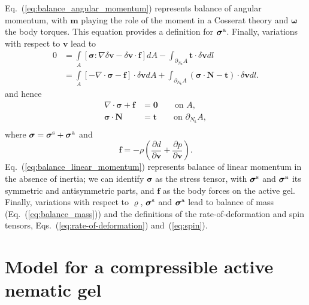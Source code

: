 Eq.~(\ref{eq:balance_angular_momentum}) represents balance of angular momentum, with $\bm{m}$ playing the role of the moment in a Cosserat theory \cite{cosserat1896theorie} and $\bm{\omega}$ the  body torques.	This equation provides a definition for $\bm{\sigma}^{\rm a}$. Finally, variations with respect to $\bm{v}$ lead to 
\begin{equation}
	\label{eq:weak_v}
	\begin{aligned}
		0 &= \underset{A}{\int} \left[\bm{\sigma}:\nabla\delta\bm{v} - \delta\bm{v}\cdot\bm{f} \right]dA - \int_{\partial_{N_{\bm{t}}} A}  \bm{t} \cdot \delta\bm{v} dl\\
		&=\underset{A}{\int} \left[-\nabla\cdot\bm{\sigma} - \bm{f} \right] \cdot \delta\bm{v}dA + \int_{\partial_{N_{\bm{t}}} A} \left(\bm{\sigma}\cdot \bm{N} -\bm{t} \right)\cdot \delta\bm{v} dl.
	\end{aligned}
\end{equation}
and hence 
\begin{equation}
	\label{eq:balance_linear_momentum}
	\begin{aligned}
		\nabla\cdot\bm{\sigma} + \bm{f} &= \bm{0} \qquad \text{on } A,\\
		\bm{\sigma}\cdot\bm{N} &= \bm{t} \qquad \text{on } \partial_{N_{\bm{t}}} A,\\
	\end{aligned}
\end{equation}
where $\bm{\sigma}=\bm{\sigma}^{\rm s} + \bm{\sigma}^{\rm a}$ and 
\begin{equation}
	\bm{f}=-\rho \left(\frac{\partial  d}{\partial \bm{v}} + \frac{\partial  p}{\partial \bm{v}}\right).
\end{equation}
Eq.~(\ref{eq:balance_linear_momentum}) represents balance of linear momentum in the 
absence of inertia; we can identify $\bm{\sigma}$ as the stress tensor, with $\bm{\sigma}^{\rm s}$ and $\bm{\sigma}^{\rm a}$  its symmetric and antisymmetric parts, and $\bm{f}$ as the body forces on the active gel.  Finally, variations with respect to $\varrho $, $\bm{\sigma}^{\rm s}$ and $\bm{\sigma}^{\rm a}$ lead to balance of mass (Eq.~(\ref{eq:balance_mass})) and the definitions of the rate-of-deformation and spin tensors, Eqs.~(\ref{eq:rate-of-deformation}) and~(\ref{eq:spin}).

\section{Model for a compressible active nematic gel} \label{sec_3}

